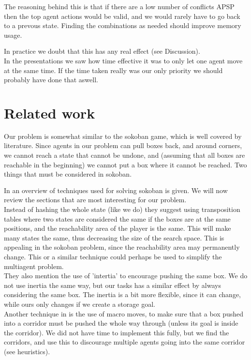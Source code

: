 \documentclass[letterpaper]{article}
\begin{document}
The reasoning behind this is that if there are a low number of conflicts APSP
then the top agent actions would be valid, and we would rarely have to go back
to a prevous state. Finding the combinations as needed should improve memory usage.

In practice we doubt that this has any real effect (see Discussion).\\

In the presentations we saw how time effective it was to only let one agent move at
the same time. If the time taken really was our only priority we should probably
have done that aswell.

\section{Related work}
Our problem is somewhat similar to the sokoban game, which is well covered by
literature. Since agents in our problem can pull boxes back, and around corners,
we cannot reach a state that cannot be undone, and (assuming that all boxes are
reachable in the beginning) we cannot put a box where it cannot be reached. Two
things that must be considered in sokoban.

In \cite{sokobanMA} an overview of techniques used for solving sokoban is given.
We will now review the sections that are most interesting for our problem.\\

Instead of hashing the whole state (like we do) they suggest using transposition
tables where two states are considered the same if the boxes are at the same positions,
and the reachability area of the player is the same. This will make many states
the same, thus decreasing the size of the search space. This is appealing in
the sokoban problem, since the reachability area may permanently change. This
or a similar technique could perhaps be used to simplify the multiagent problem.\\

They also mention the use of 'intertia' to encourage pushing the same box.
We do not use inertia the same way, but our tasks has a similar effect by
always considering the same box. The inertia is a bit more flexible, since
it can change, while ours only changes if we create a storage goal.\\

Another technique in \cite{sokobanMA} is the use of macro moves, to make
sure that a box pushed into a corridor must be pushed the whole way through
(unless its goal is inside the corridor). We did not have time to implement
this fully, but we find the corridors, and use this to discourage multiple agents
going into the same corridor (see heuristics).
\end{document}
